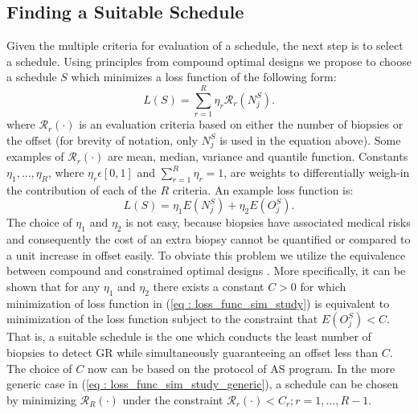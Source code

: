 \subsection{Finding a Suitable Schedule}
Given the multiple criteria for evaluation of a schedule, the next step is to select a schedule. Using principles from compound optimal designs \citep{lauter1976optimal} we propose to choose a schedule $S$ which minimizes a loss function of the following form:
\begin{equation}
\label{eq : loss_func_sim_study_generic}
L(S) = \sum_{r=1}^R \eta_r \mathcal{R}_r(N^S_j).
\end{equation}
where $\mathcal{R}_r(\cdot)$ is an evaluation criteria based on either the number of biopsies or the offset (for brevity of notation, only $N^S_j$ is used in the equation above). Some examples of $\mathcal{R}_r(\cdot)$ are mean, median, variance and quantile function. Constants $\eta_1, \ldots, \eta_R$, where $\eta_r \epsilon [0,1]$ and $\sum_{r=1}^R \eta_r = 1$, are weights to differentially weigh-in the contribution of each of the $R$ criteria. An example loss function is:
\begin{equation}
\label{eq : loss_func_sim_study}
L(S) = \eta_1 E(N^S_j) + \eta_2 E(O^S_j). 
\end{equation}
The choice of $\eta_1$ and $\eta_2$ is not easy, because biopsies have associated medical risks and consequently the cost of an extra biopsy cannot be quantified or compared to a unit increase in offset easily. To obviate this problem we utilize the equivalence between compound and constrained optimal designs \citep{cook1994equivalence}. More specifically, it can be shown that for any $\eta_1$ and $\eta_2$ there exists a constant $C>0$ for which minimization of loss function in (\ref{eq : loss_func_sim_study}) is equivalent to minimization of the loss function subject to the constraint that $E(O^S_j) < C$. That is, a suitable schedule is the one which conducts the least number of biopsies to detect GR while simultaneously guaranteeing an offset less than $C$. The choice of $C$ now can be based on the protocol of AS program. In the more generic case in (\ref{eq : loss_func_sim_study_generic}), a schedule can be chosen by minimizing $\mathcal{R}_R(\cdot)$ under the constraint $\mathcal{R}_r(\cdot) < C_r; r=1, \ldots, R-1$.
